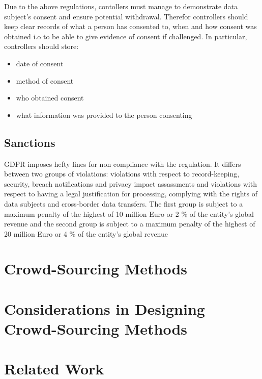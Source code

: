 \documentclass[a4paper,12pt]{report}
\begin{document}
	Due to the above regulations, contollers must manage to demonstrate data subject's consent and ensure potential withdrawal.
	Therefor controllers should keep clear records of what a person has consented to, when and how consent was obtained i.o to be able to give evidence of consent if challenged.
	In particular, controllers should store:
	\begin{itemize}
		\item date of consent
		\item method of consent
		\item who obtained consent
		\item what information was provided to the person consenting
	\end{itemize}


	\closesection

	\section{Sanctions}
	\startsection
	GDPR imposes hefty fines for non compliance with the regulation.
	It differs between two groups of violations: violations with respect to record-keeping, security, breach notifications and privacy impact assassments and violations with respect to having a legal justification for processing, complying with the rights of data subjects and cross-border data transfers.
	The first group is subject to a maximum penalty of the highest of 10 million Euro or 2 \% of the entity's global revenue and the second group is subject to a maximum penalty of the highest of 20 million Euro or 4 \% of the entity's global revenue
	\closesection
	
	\chapter{Crowd-Sourcing Methods}
	\startsection
	\closesection

	\chapter{Considerations in Designing Crowd-Sourcing Methods}
	\startsection
	\closesection
	
	\chapter{Related Work \cite{LanierWeylBlueprint}}
	\startsection
	\closesection


	\newpage
	\printbibliography
\end{document}
